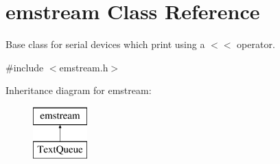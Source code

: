 \hypertarget{classemstream}{}\section{emstream Class Reference}
\label{classemstream}


Base class for serial devices which print using a {\ttfamily $<$$<$} operator.  




{\ttfamily \#include $<$emstream.\+h$>$}

Inheritance diagram for emstream\+:\begin{figure}[H]
\begin{center}
\leavevmode
\includegraphics[height=2.000000cm]{classemstream}
\end{center}
\end{figure}
